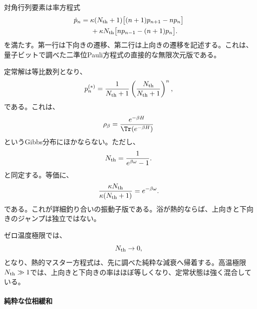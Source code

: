 \documentclass[a4paper,11pt,oneside]{article}
\theoremstyle{definition}
\numberwithin{equation}{section}
\begin{document}
対角行列要素は率方程式
\begin{align}\label{oscPauliThermal}
\dot p_n
&=
\kappa(N_{\rm th}+1)\bigl[(n+1)p_{n+1}-np_n\bigr]
\nonumber\\
&\hspace{0.5cm}
+\kappa N_{\rm th}\bigl[np_{n-1}-(n+1)p_n\bigr] .
\end{align}
を満たす。第一行は下向きの遷移、第二行は上向きの遷移を記述する。これは、量子ビットで調べた二準位Pauli方程式の直接的な無限次元版である。



定常解は等比数列となり、
\begin{equation}
p_n^{(\ast)}
=
\frac{1}{N_{\rm th}+1}
\left(
\frac{N_{\rm th}}{N_{\rm th}+1}
\right)^n ,
\end{equation}
である。これは、
\begin{equation}
\rho_\beta
=
\frac{e^{-\beta H}}{\Tr(e^{-\beta H})}
\end{equation}
というGibbs分布にほかならない。ただし、
\begin{equation}\label{NthBose}
N_{\rm th}=\frac{1}{e^{\beta\omega}-1} .
\end{equation}
と同定する。等価に、
\begin{equation}
\frac{\kappa N_{\rm th}}{\kappa(N_{\rm th}+1)}
=
e^{-\beta\omega} .
\end{equation}
である。これが詳細釣り合いの振動子版である。浴が熱的ならば、上向きと下向きのジャンプは独立ではない。



ゼロ温度極限では、
\begin{equation}
N_{\rm th}\to 0 ,
\end{equation}
となり、熱的マスター方程式は、先に調べた純粋な減衰へ帰着する。高温極限$N_{\rm th}\gg 1$では、上向きと下向きの率はほぼ等しくなり、定常状態は強く混合している。





\paragraph{純粋な位相緩和}
\end{document}
